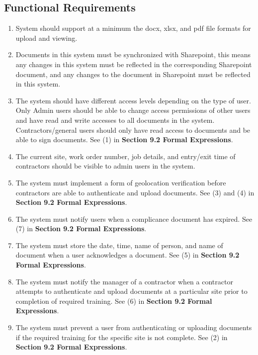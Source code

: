 \documentclass[12pt]{article}
\begin{document}
\subsection{Functional Requirements}
\begin{enumerate} [{FR}1.]
  \item System should support at a minimum the docx, xlsx, and pdf
    file formats for upload and viewing.
  \item Documents in this system must be synchronized with
    Sharepoint, this means any changes in this system must be
    reflected in the corresponding Sharepoint document, and any
    changes to the document in Sharepoint must be reflected in this system.
  \item The system should have different access levels depending on
    the type of user. Only Admin users should be able to change
    access permissions of other users and have read and write
    accesses to all documents in the system. Contractors/general
    users should only have read access to documents and be able to
    sign documents. See (1) in \textbf{Section 9.2 Formal Expressions}.
  \item The current site, work order number, job details, and entry/exit time of
    contractors should be visible to admin users in the system.
  \item The system must implement a form of geolocation verification before
    contractors are able to authenticate and upload documents. See (3) and
    (4) in \textbf{Section 9.2 Formal Expressions}.
  \item The system must notify users when a complicance document has expired.
    See (7) in \textbf{Section 9.2 Formal Expressions}.
  \item The system must store the date, time, name of person, and name of
    document when a user acknowledges a document. See (5) in
    \textbf{Section 9.2 Formal Expressions}.
  \item The system must notify the manager of a contractor when a contractor
    attempts to authenticate and upload documents at a particular site prior to
    completion of required training. See (6) in
    \textbf{Section 9.2 Formal Expressions}.
  \item The system must prevent a user from authenticating or uploading
    documents if the required training for the specific site is not complete.
    See (2) in \textbf{Section 9.2 Formal Expressions}.

\end{enumerate}
\end{document}
